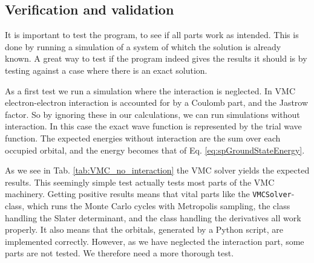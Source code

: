 \subsection{Verification and validation}

	It is important to test the program, to see if all parts work as intended. This is done by running a simulation of a system of whitch the solution is already known. A great way to test if the program indeed gives the results it should is by testing against a case where there is an exact solution. 

	As a first test we run a simulation where the interaction is neglected. In VMC electron-electron interaction is accounted for by a Coulomb part, and the Jastrow factor. So by ignoring these in our calculations, we can run simulations without interaction. In this case the exact wave function is represented by the trial wave function. The expected energies without interaction are the sum over each occupied orbital, and the energy becomes that of Eq. \eqref{eq:spGroundStateEnergy}.

	As we see in Tab. \ref{tab:VMC_no_interaction} the VMC solver yields the expected results. This seemingly simple test actually tests most parts of the VMC machinery. Getting positive results means that vital parts like the {\tt VMCSolver}-class, which runs the Monte Carlo cycles with Metropolis sampling, the class handling the Slater determinant, and the class handling the derivatives all work properly. It also means that the orbitals, generated by a Python script, are implemented correctly. However, as we have neglected the interaction part, some parts are not tested. We therefore need a more thorough test. 
	
